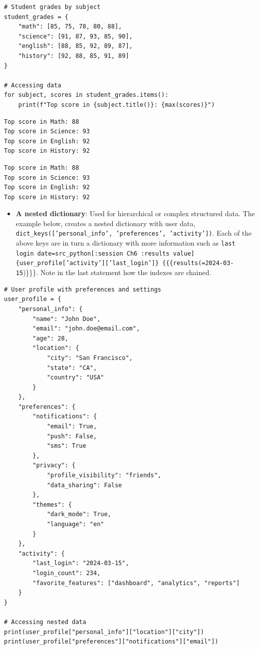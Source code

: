 \documentclass[10pt]{book}
\begin{document}
\label{org3adf614}
\begin{verbatim}
# Student grades by subject
student_grades = {
    "math": [85, 75, 78, 80, 88],
    "science": [91, 87, 93, 85, 90],
    "english": [88, 85, 92, 89, 87],
    "history": [92, 88, 85, 91, 89]
}

# Accessing data
for subject, scores in student_grades.items():
    print(f"Top score in {subject.title()}: {max(scores)}")
\end{verbatim}

\label{org84d2f92}
\begin{verbatim}
Top score in Math: 88
Top score in Science: 93
Top score in English: 92
Top score in History: 92
\end{verbatim}

\label{org19e76bc}
\begin{verbatim}
Top score in Math: 88
Top score in Science: 93
Top score in English: 92
Top score in History: 92
\end{verbatim}

\begin{itemize}
\item \textbf{A nested dictionary}: Used for hierarchical or complex structured data. The example below, creates a nested dictionary with user data, \texttt{dict\_keys(['personal\_info', 'preferences', 'activity'])}. Each of the above keys are in turn a dictionary with more information such as \texttt{last login date=src\_python[:session Ch6 :results value]\{user\_profile['activity']['last\_login']\} \{\{\{results(=2024-03-15})\}\}\}. Note in the last statement how the indexes are chained.
\end{itemize}
\label{org7d927c9}
\begin{verbatim}
# User profile with preferences and settings
user_profile = {
    "personal_info": {
        "name": "John Doe",
        "email": "john.doe@email.com",
        "age": 28,
        "location": {
            "city": "San Francisco",
            "state": "CA",
            "country": "USA"
        }
    },
    "preferences": {
        "notifications": {
            "email": True,
            "push": False,
            "sms": True
        },
        "privacy": {
            "profile_visibility": "friends",
            "data_sharing": False
        },
        "themes": {
            "dark_mode": True,
            "language": "en"
        }
    },
    "activity": {
        "last_login": "2024-03-15",
        "login_count": 234,
        "favorite_features": ["dashboard", "analytics", "reports"]
    }
}

# Accessing nested data
print(user_profile["personal_info"]["location"]["city"]) 
print(user_profile["preferences"]["notifications"]["email"])
\end{verbatim}
\end{document}
